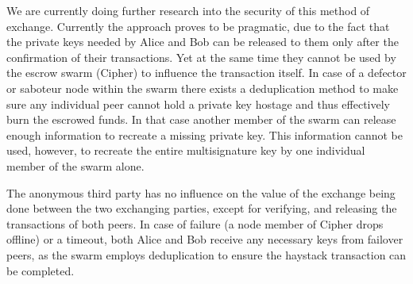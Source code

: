 \documentclass[11pt, a4paper]{article}
\begin{document}
We are currently doing further research into the security of this method of exchange. Currently the approach proves to be pragmatic, due to the fact that the private keys needed by Alice and Bob can be released to them only after the confirmation of their transactions. Yet at the same time they cannot be used by the escrow swarm (Cipher) to influence the transaction itself. In case of a defector or saboteur node within the swarm there exists a deduplication method to make sure any individual peer cannot hold a private key hostage and thus effectively burn the escrowed funds. In that case another member of the swarm can release enough information to recreate a missing private key. This information cannot be used, however, to recreate the entire multisignature key by one individual member of the swarm alone.

The anonymous third party has no influence on the value of the exchange being done between the two exchanging parties, except for verifying, and releasing the transactions of both peers. In case of failure (a node member of Cipher drops offline) or a timeout, both Alice and Bob receive any necessary keys from failover peers, as the swarm employs deduplication to ensure the haystack transaction can be completed.
\end{document}
